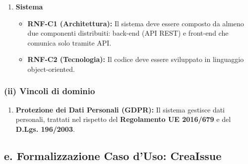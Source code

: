 \documentclass[a4paper,12pt]{article}
\begin{document}
\begin{tcolorbox}
\begin{enumerate}[label=\textbf{RNF-\arabic*}, leftmargin=*, itemsep=8pt]
    \item \textbf{Sistema}
    \begin{itemize}
        \item \textbf{RNF-C1 (Architettura):} Il sistema deve essere composto da almeno due componenti distribuiti: back-end (API REST) e front-end che comunica solo tramite API.
        \item \textbf{RNF-C2 (Tecnologia):} Il codice deve essere sviluppato in linguaggio object-oriented.
    \end{itemize}
\end{enumerate}
\end{tcolorbox}

\newpage
\subsubsection*{(ii) Vincoli di dominio}
{}

\begin{tcolorbox}[
    enhanced,
    colback=BoxLight,
    colframe=AccentColor,
    boxrule=0.8pt,
    arc=3pt,
    sharp corners,
    title=Vincoli di Dominio (VD-1),
    fonttitle=\bfseries\color{AccentColor},
    coltitle=AccentColor,
    breakable
]
\begin{enumerate}[label=\textbf{VD-\arabic*}, leftmargin=*, itemsep=6pt]
    \item \textbf{Protezione dei Dati Personali (GDPR):} 
    Il sistema gestisce dati personali, trattati nel rispetto del \textbf{Regolamento UE 2016/679} e del \textbf{D.Lgs. 196/2003}. 
\end{enumerate}
\end{tcolorbox}

\newpage
\subsection*{e. Formalizzazione Caso d'Uso:  CreaIssue}
{}

\end{document}
